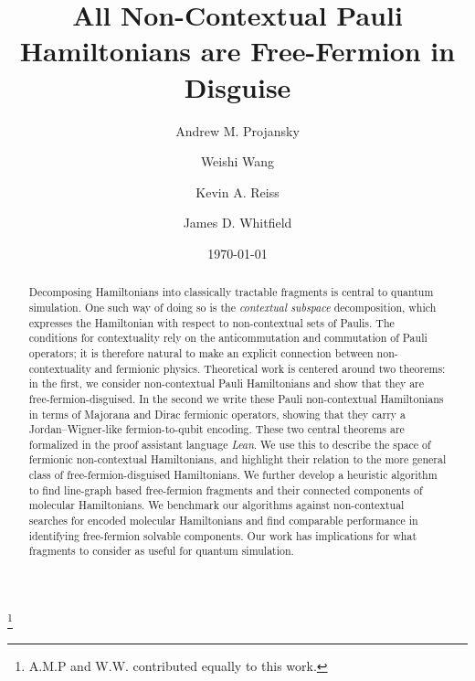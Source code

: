 \documentclass[%
 aip,
 amsmath,amssymb,
 reprint,%
]{revtex4-1}
\begin{document}

\title{All Non-Contextual Pauli Hamiltonians are Free-Fermion in Disguise}

\author{Andrew M. Projansky}
\author{Weishi Wang}
\thanks{A.M.P and W.W. contributed equally to this work.}
\author{Kevin A. Reiss}
\author{James D. Whitfield}%
%

\date{\today}%

\begin{abstract}
    Decomposing Hamiltonians into classically tractable fragments is central to quantum simulation. One such way of doing so is the {\it contextual subspace} decomposition, which expresses the Hamiltonian with respect to non-contextual sets of Paulis. The conditions for contextuality rely on the anticommutation and commutation of Pauli operators; it is therefore natural to make an explicit connection between non-contextuality and fermionic physics. Theoretical work is centered around two theorems: in the first, we consider non-contextual Pauli Hamiltonians and show that they are free-fermion-disguised. In the second we write these Pauli non-contextual Hamiltonians in terms of Majorana and Dirac fermionic operators, showing that they carry a Jordan--Wigner-like fermion-to-qubit encoding. These two central theorems are formalized in the proof assistant language {\it Lean}. We use this to describe the space of fermionic non-contextual Hamiltonians, and highlight their relation to the more general class of free-fermion-disguised Hamiltonians. 
    We further develop a heuristic algorithm to find
    line-graph based free-fermion fragments and their connected components of molecular Hamiltonians. We benchmark our algorithms against non-contextual searches for encoded molecular Hamiltonians and find comparable performance in identifying free-fermion solvable components. Our work has implications for what fragments to consider as useful for quantum simulation. 
\end{abstract}
\end{document}
